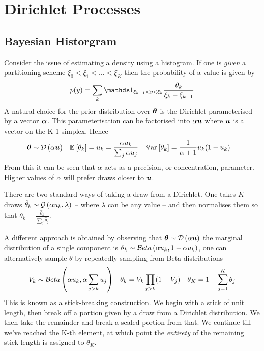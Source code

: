 

\section{Dirichlet Processes}

\subsection{Bayesian Historgram}
Consider the issue of estimating a density using a histogram. If one is \emph{given} a partitioning scheme $\xi_0 < \xi_1 < \ldots < \xi_K$ then the probability of a value is given by
\begin{align}
p(y) = \sum_k \one_{\xi_{k-1}<y<\xi_k} \frac{\theta_k}{\xi_k - \xi_{k-1}} \label{chap1:eqn:bayes-hist}
\end{align}
A natural choice for the prior distribution over $\bm \theta$ is the Dirichlet parameterised by a vector $\bm \alpha$. This parameterisation can be factorised into $\alpha \bm u$ where $\bm u$ is a vector on the K-1 simplex. Hence
\begin{align}
\bm \theta &\sim \mathcal{D} \left( {\alpha \bm u} \right) &
\mathbb{E}_{ {  } }\left[ \theta_k \right] & = u_k = \frac{\alpha u_k}{\sum_j \alpha u_j} &
\mathbb{V}\text{ar}_{ {  } }\left[ \theta_k \right] & = \frac{1}{ {\alpha + 1} } u_k (1 - u_k) \label{chap1:eqn:dir-variance-etc}
\end{align}
From this it can be seen that $\alpha$ acts as a precision, or concentration, parameter. Higher values of $\alpha$ will prefer draws closer to $\bm u$.

There are two standard ways of taking a draw from a Dirichlet. One takes $K$ draws $\hat{\theta}_k \sim \mathcal{G} \left( {\alpha u_k}, {\lambda} \right)$ -- where $\lambda$ can be any value -- and then normalises them so that $\theta_k = \frac{\hat{\theta}_k}{\sum_j \hat{\theta}_j}$. 

A different approach is obtained by observing that $\bm \theta \sim \mathcal{D} \left( {\alpha \bm u} \right)$ the marginal distribution of a single component is $\theta_k \sim \mathcal{B}eta \left( {\alpha u_k}, {1- \alpha u_k} \right)$, one can alternatively sample $\theta$ by repeatedly sampling from Beta distributions
\begin{align}
V_k & \sim \mathcal{B}eta \left( {\alpha u_k}, {\alpha \sum_{j>k} u_j} \right) &
\theta_k & = V_k \prod_{j > k}(1 - V_j) &
\theta_K = 1 - \sum_{j=1}^{K} \theta_j
\end{align}
This is known as a stick-breaking construction. We begin with a stick of unit length, then break off a portion given by a draw from a Dirichlet distribution. We then take the remainder and break a scaled portion from that. We continue till we've reached the K-th element, at which point the \emph{entirety} of the remaining stick length is assigned to $\theta_K$.

